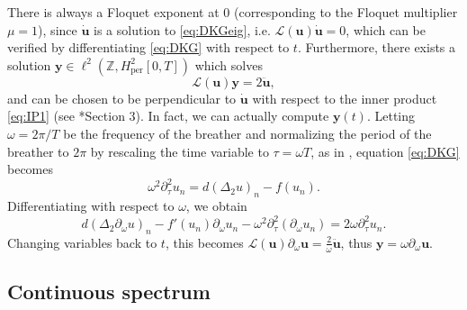 \documentclass[12pt,reqno]{amsart}
\def\Z{{\mathbb Z}}
\def\per{\textrm{per}}
\def\calL{\mathcal{L}}
\newcommand{\uvec}{\mathbf{u}}
\newcommand{\yvec}{\mathbf{y}}
\theoremstyle{definition}
\begin{document}
There is always a Floquet exponent at 0 (corresponding to the Floquet multiplier $\mu = 1$), since $\dot{\uvec}$ is a solution to \cref{eq:DKGeig}, i.e. $\calL(\uvec)\dot{\uvec} = 0$, which can be verified by differentiating \cref{eq:DKG} with respect to $t$. Furthermore, there exists a solution $\yvec \in \ell^2(\Z, H^2_\per[0,T])$ which solves 
\begin{equation}
\calL(\uvec)\yvec = 2 \ddot{\uvec},
\end{equation}
and can be chosen to be perpendicular to $\dot{\uvec}$ with respect to the inner product \cref{eq:IP1} (see \cite{Pelinovsky2012}*{Section 3}). In fact, we can actually compute $\yvec(t)$. 
Letting $\omega = 2 \pi / T$ be the frequency of the breather and normalizing the period of the breather to $2 \pi$ by rescaling the time variable to $\tau = \omega T$, as in \cite{kevrekidis2016}, equation \cref{eq:DKG} becomes
\begin{equation}\label{eq:DKGomega}
\omega^2 \partial_\tau^2 u_n = d (\Delta_2 u)_n - f(u_n).
\end{equation}
Differentiating with respect to $\omega$, we obtain
\begin{equation}\label{eq:DKGdiffw}
d (\Delta_2 \partial_\omega u)_n - f'(u_n)\partial_\omega u_n 
- \omega^2 \partial_\tau^2 ( \partial_\omega u_n) = 2 \omega \partial_\tau^2 u_n.
\end{equation}
Changing variables back to $t$, this becomes $\calL(\uvec)\partial_\omega \uvec = \frac{2}\omega \ddot{\uvec}$, thus $\yvec = \omega \partial_\omega \uvec$.

\subsection{Continuous spectrum}
\end{document}
